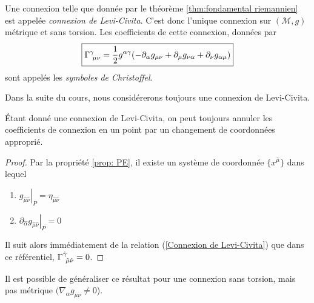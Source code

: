 \begin{theoremframe}
    \begin{defi}
        Une connexion telle que donnée par le théorème \ref{thm:fondamental riemannien} est appelée \emph{connexion de Levi-Civita}. C'est donc l'unique connexion sur $(\mathcal{M},g)$ métrique et sans torsion. Les coefficients de cette connexion, données par
        \begin{equation}
            \boxed{\Gamma\indices{^{\gamma}_{\!\mu \nu}} = \frac{1}{2}g^{\alpha \gamma}( - \partial_{\alpha}g_{\mu \nu} + \partial_{\mu}g_{\nu \alpha} + \partial_{\nu}g_{\alpha \mu})}
    \label{Connexion de Levi-Civita}
        \end{equation}
        sont appelés les \emph{symboles de Christoffel}.
    \end{defi}
\end{theoremframe}
Dans la suite du cours, nous considérerons toujours une connexion de Levi-Civita.
\begin{theoremframe}
    \begin{propri}
        Étant donné une connexion de Levi-Civita, on peut toujours annuler les coefficients de connexion en un point par un changement de coordonnées approprié. 
    \end{propri}
\end{theoremframe}
\begin{proof}
   Par la propriété \ref{prop: PE}, il existe un système de coordonnée $\{x^{\hat{\mu}}\}$ dans lequel 
    \begin{enumerate}
        \item $\left. g_{\hat{\mu}\hat{\nu}} \right|_P = \eta_{\hat{\mu}\hat{\nu}}$
        \item $ \left. \partial_{\hat{\alpha}}g_{\hat{\mu}\hat{\nu}} \right|_P=0$
    \end{enumerate}
    Il suit alors immédiatement de la relation (\ref{Connexion de Levi-Civita}) que dans ce référentiel, $ \Gamma\indices{^{\hat{\gamma}}_{\!\hat{\mu} \hat{\nu}}} =0$. 
\end{proof}
Il est possible de généraliser ce résultat pour une connexion sans torsion, mais pas métrique $( \nabla_{\alpha}g_{\mu \nu} \neq 0$).
